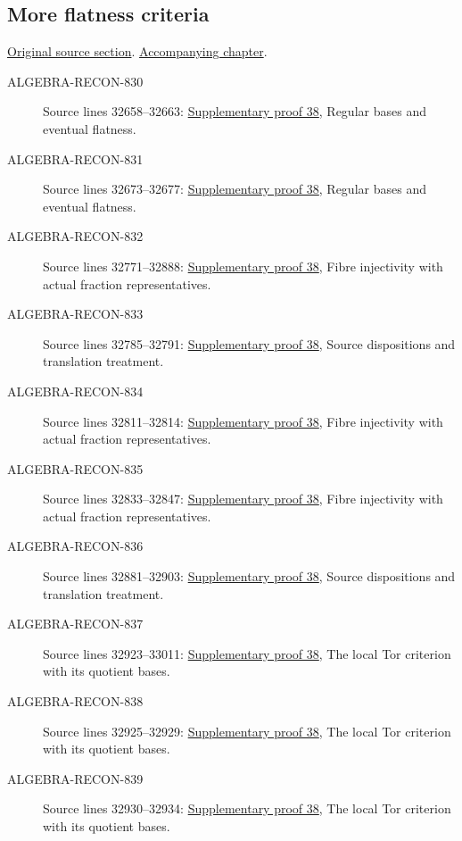 \subsection{More flatness criteria}
\hypertarget{algebra-source-section-more-flatness-criteria}{}
\noindent\href{https://github.com/stacks/stacks-project/blob/a04446e57ec1fbc252a871afcec7752fb2807b14/algebra.tex\#L32643}{Original source section}. \href{algebra.pdf\#nameddest=section-more-flatness-criteria}{Accompanying chapter}.

\begin{description}
\item[ALGEBRA-RECON-830] Source lines 32658--32663: \hyperlink{algebra_more_flatness_notes_20260928}{Supplementary proof 38}, Regular bases and eventual flatness.
\item[ALGEBRA-RECON-831] Source lines 32673--32677: \hyperlink{algebra_more_flatness_notes_20260928}{Supplementary proof 38}, Regular bases and eventual flatness.
\item[ALGEBRA-RECON-832] Source lines 32771--32888: \hyperlink{algebra_more_flatness_notes_20260928}{Supplementary proof 38}, Fibre injectivity with actual fraction representatives.
\item[ALGEBRA-RECON-833] Source lines 32785--32791: \hyperlink{algebra_more_flatness_notes_20260928}{Supplementary proof 38}, Source dispositions and translation treatment.
\item[ALGEBRA-RECON-834] Source lines 32811--32814: \hyperlink{algebra_more_flatness_notes_20260928}{Supplementary proof 38}, Fibre injectivity with actual fraction representatives.
\item[ALGEBRA-RECON-835] Source lines 32833--32847: \hyperlink{algebra_more_flatness_notes_20260928}{Supplementary proof 38}, Fibre injectivity with actual fraction representatives.
\item[ALGEBRA-RECON-836] Source lines 32881--32903: \hyperlink{algebra_more_flatness_notes_20260928}{Supplementary proof 38}, Source dispositions and translation treatment.
\item[ALGEBRA-RECON-837] Source lines 32923--33011: \hyperlink{algebra_more_flatness_notes_20260928}{Supplementary proof 38}, The local Tor criterion with its quotient bases.
\item[ALGEBRA-RECON-838] Source lines 32925--32929: \hyperlink{algebra_more_flatness_notes_20260928}{Supplementary proof 38}, The local Tor criterion with its quotient bases.
\item[ALGEBRA-RECON-839] Source lines 32930--32934: \hyperlink{algebra_more_flatness_notes_20260928}{Supplementary proof 38}, The local Tor criterion with its quotient bases.

\end{description}
